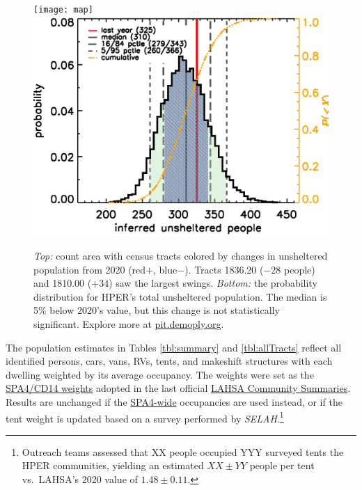 \documentclass[11pt]{article}
\begin{document}
\begin{figure}
	\centering
	\texttt{[image: map]}
	\includegraphics[width=\linewidth, trim = 0cm 0cm 0cm 0cm]{hper2021Hist}
	\caption{{\it Top:} count area with census tracts colored by  
			changes in unsheltered population from 2020 (red$+$, blue$-$).
			Tracts 1836.20 ($-28$ people) and 1810.00 ($+34$) saw the largest swings. 
			{\it Bottom:} the probability distribution for HPER's total unsheltered 
			population. The median is 5\% below 2020's value, but this change is not 
			statistically significant.
			Explore more at \href{https://pit.demoply.org}{pit.demoply.org}.}
	\label{fig:tcomp}
\end{figure} 

 The population estimates in Tables \ref{tbl:summary} and \ref{tbl:allTracts} 
reflect all identified persons, cars, vans, RVs, tents, and makeshift structures with each
dwelling weighted by its average occupancy. The weights were set as the 
\href{https://www.lahsa.org/documents?id=4635-usc-2018-2020-multipliers-and-estimates-overview}
{SPA4/CD14 weights} adopted in the last official 
\href{https://www.lahsa.org/documents?id=4686-2020-greater-los-angeles-city-community-homelessness-report-service-planning-area-4.pdf}{LAHSA Community Summaries}. Results are unchanged if 
the \href{https://www.lahsa.org/documents?id=4693-2020-greater-los-angeles-homeless-count-cvrtm-conversion-factors}{SPA4-wide} occupancies are used instead, or if the tent weight is 
updated based on a survey performed by {\it SELAH}.\footnote{Outreach teams 
assessed that XX people occupied YYY surveyed tents the HPER communities,
yielding an estimated $XX\pm YY$ people per tent vs.~LAHSA's 2020 value of $1.48\pm0.11$.}
\end{document}
